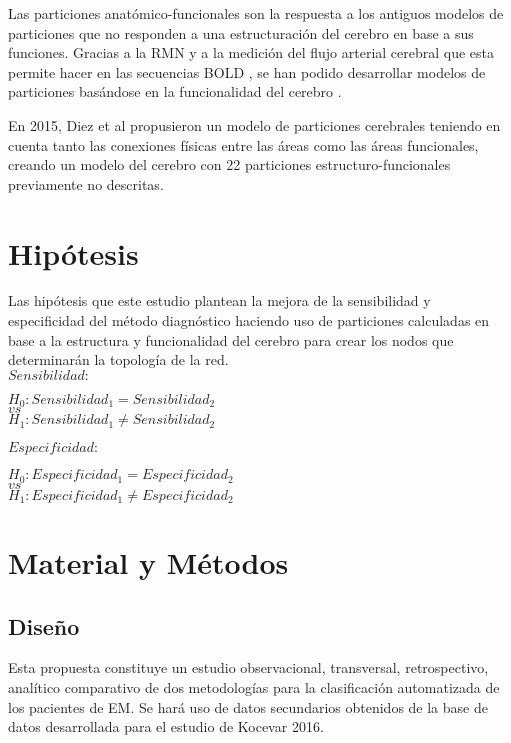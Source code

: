 \documentclass[fleqn,10pt]{UICArticle} %
\begin{document}
Las particiones anatómico-funcionales son la respuesta a los antiguos modelos de particiones que no responden a una estructuración del cerebro en base a sus funciones. Gracias a la RMN y a la medición del flujo arterial cerebral que esta permite hacer en las secuencias BOLD \cite{Ogawa1990}, se han podido desarrollar modelos de particiones basándose en la funcionalidad del cerebro \cite{Heller2006}.

En 2015, Diez et al \cite{Diez2015} propusieron un modelo de particiones cerebrales teniendo en cuenta tanto las conexiones físicas entre las áreas como las áreas funcionales, creando un modelo del cerebro con 22 particiones estructuro-funcionales previamente no descritas. 


\section{Hipótesis}

Las hipótesis que este estudio plantean la mejora de la sensibilidad y especificidad del método diagnóstico haciendo uso de particiones calculadas en base a la estructura y funcionalidad del cerebro para crear los nodos que determinarán la topología de la red. 
\vspace{1em} \\
$Sensibilidad:$
\begin{center}
$H_0: Sensibilidad_1 = Sensibilidad_2$ \\
$vs$ \\
$H_1: Sensibilidad_1 \neq Sensibilidad_2$
\end{center}
$Especificidad:$
\begin{center}
$H_0: Especificidad_1 = Especificidad_2$ \\
$vs$ \\
$H_1: Especificidad_1 \neq Especificidad_2$
\end{center}

\section{Material y Métodos}

\subsection{Diseño}

Esta propuesta constituye un estudio observacional, transversal, retrospectivo, analítico comparativo de dos metodologías para la clasificación automatizada de los pacientes de EM. Se hará uso de datos secundarios obtenidos de la base de datos desarrollada para el estudio de Kocevar 2016\cite{Kocevar2016}.
\end{document}
